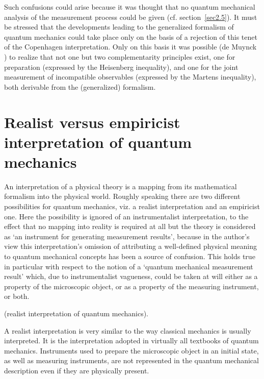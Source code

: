 \documentclass[12pt]{article}
\begin{document}
Such confusions could arise because it was thought that no quantum
mechanical analysis of the measurement process could be given (cf.
section~\ref{sec2.5}). It must be stressed that the developments
leading to the generalized formalism of quantum mechanics could
take place only on the basis of a rejection of this tenet of the
Copenhagen interpretation. Only on this basis it was possible (de
Muynck \cite{dM2000}) to realize that not one but two
complementarity principles exist, one for preparation (expressed
by the Heisenberg inequality), and one for the joint measurement
of incompatible observables (expressed by the Martens inequality),
both derivable from the (generalized) formalism.

\section{Realist versus empiricist interpretation of quantum
mechanics}\label{sec3} An interpretation of a physical theory is a
mapping from its mathematical formalism into the physical world.
Roughly speaking there are two different possibilities for quantum
mechanics, viz. a realist interpretation and an empiricist one.
Here the possibility is ignored of an instrumentalist
interpretation, to the effect that no mapping into reality is
required at all but the theory is considered as `an instrument for
generating measurement results', because in the author's view this
interpretation's omission of attributing a well-defined physical
meaning to quantum mechanical concepts has been a source of
confusion. This holds true in particular with respect to the
notion of a `quantum mechanical measurement result' which, due to
instrumentalist vagueness, could be taken at will either as a
property of the microscopic object, or as a property of the
measuring instrument, or both.

 (realist
interpretation of quantum mechanics).

\noindent A realist interpretation is very similar to the way
classical mechanics is usually interpreted. It is the
interpretation adopted in virtually all textbooks of quantum
mechanics. Instruments used to prepare the microscopic object in
an initial state, as well as measuring instruments, are not
represented in the quantum mechanical description even if they are
physically present.
\end{document}
